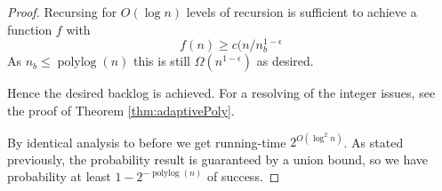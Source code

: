 \documentclass[twocolumn]{article}[10pt]
\newcommand{\defn}[1]{{\textit{\textbf{\boldmath #1}}}\xspace}
\DeclareMathOperator{\polylog}{\text{polylog}}
\DeclareMathOperator{\poly}{\text{poly}}
\newtheorem{clm}{Claim}
\begin{document}
\begin{proof}
  Recursing for $O(\log n)$ levels of recursion is sufficient to achieve a function $f$ with 
  $$f(n) \ge c(n/n_b^{1-\epsilon}$$
  As $n_b \le \polylog(n)$ this is still $\Omega(n^{1-\epsilon})$ as desired.

  Hence the desired backlog is achieved. For a resolving of the integer issues,
  see the proof of Theorem \ref{thm:adaptivePoly}.

  By identical analysis to before we get running-time $2^{O(\log^2 n)}$.
  As stated previously, the probability result is guaranteed by a union bound,
  so we have probability at least $1-2^{-\polylog(n)}$ of success.
\end{proof}

\end{document}
